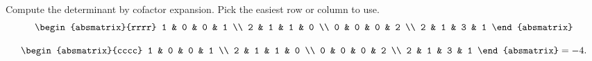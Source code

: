 \begin{ex}
  Compute the determinant by cofactor expansion. Pick the easiest row or
  column to use.
  \begin{equation*}
    \begin{absmatrix}{rrrr}
      1 & 0 & 0 & 1 \\
      2 & 1 & 1 & 0 \\
      0 & 0 & 0 & 2 \\
      2 & 1 & 3 & 1
    \end{absmatrix}
  \end{equation*}
  \begin{sol}
    \begin{equation*}
      \begin{absmatrix}{cccc}
        1 & 0 & 0 & 1 \\
        2 & 1 & 1 & 0 \\
        0 & 0 & 0 & 2 \\
        2 & 1 & 3 & 1
      \end{absmatrix} = -4.
    \end{equation*}
  \end{sol}
\end{ex}

